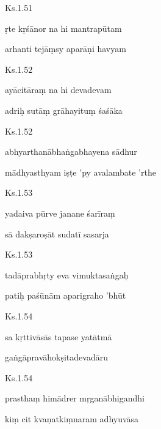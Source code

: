 \documentclass{tufte-handout}
\newenvironment{sanskrit}%
{\begin{otherlanguage}{sanskrit-devanagari}}%
{\end{otherlanguage}}
\begin{document}
    
	\begin{sanskrit}
	
	    
		Ks.1.51 
    
	    
		ṛte kṛśānor na hi mantrapūtam 
    
	    
		arhanti tejāṃsy aparāṇi havyam 
    
	\end{sanskrit}

    
	\begin{sanskrit}
	
	    
		Ks.1.52 
    
	    
		ayācitāraṃ na hi devadevam 
    
	    
		adriḥ sutāṃ grāhayituṃ śaśāka 
    
	\end{sanskrit}

    
	\begin{sanskrit}
	
	    
		Ks.1.52 
    
	    
		abhyarthanābhaṅgabhayena sādhur 
    
	    
		mādhyasthyam iṣṭe 'py avalambate 'rthe 
    
	\end{sanskrit}

    
	\begin{sanskrit}
	
	    
		Ks.1.53 
    
	    
		yadaiva pūrve janane śarīraṃ 
    
	    
		sā dakṣaroṣāt sudatī sasarja 
    
	\end{sanskrit}

    
	\begin{sanskrit}
	
	    
		Ks.1.53 
    
	    
		tadāprabhṛty eva vimuktasaṅgaḥ 
    
	    
		patiḥ paśūnām aparigraho 'bhūt 
    
	\end{sanskrit}

    
	\begin{sanskrit}
	
	    
		Ks.1.54 
    
	    
		sa kṛttivāsās tapase yatātmā 
    
	    
		gaṅgāpravāhokṣitadevadāru 
    
	\end{sanskrit}

    
	\begin{sanskrit}
	
	    
		Ks.1.54 
    
	    
		prasthaṃ himādrer mṛganābhigandhi 
    
	    
		kiṃ cit kvaṇatkiṃnaram adhyuvāsa 
    
	\end{sanskrit}
\end{document}
